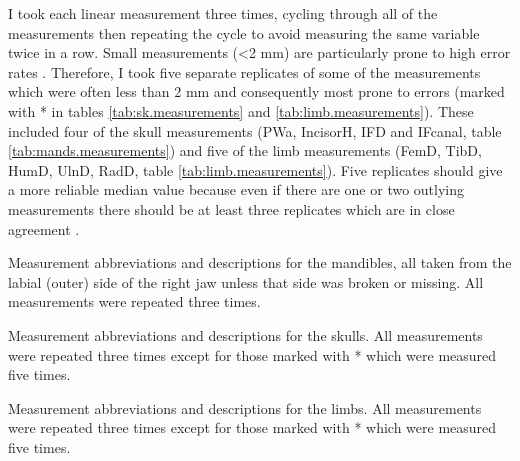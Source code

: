 	I took each linear measurement three times, cycling through all of the measurements then repeating the cycle to avoid measuring the same variable twice in a row. Small measurements (<2 mm) are particularly prone to high error rates \citep{Cardini2008}. Therefore, I took five separate replicates of some of the measurements which were often less than 2 mm and consequently most prone to errors (marked with * in tables \ref{tab:sk.measurements} and \ref{tab:limb.measurements}). These included four of the skull measurements (PWa, IncisorH, IFD and IFcanal, table \ref{tab:mands.measurements}) and five of the limb measurements (FemD, TibD, HumD, UlnD, RadD, table \ref{tab:limb.measurements}). 
	Five replicates should give a more reliable median value because even if there are one or two outlying measurements there should be at least three replicates which are in close agreement \citep{Cooper2009}.

\begin{table}[!htbp]
	\caption[Mandible measurements]
			{Measurement abbreviations and descriptions for the mandibles, all taken from the labial (outer) side of the right jaw unless that side was broken or missing. All measurements were repeated three times.}
	
	\label{tab:mands.measurements}
\end{table}



\begin{table}[!htbp]
	\caption[Skull measurements]
			{Measurement abbreviations and descriptions for the skulls. All measurements were repeated three times except for those marked with * which were measured five times.}%
	
	\label{tab:sk.measurements}
\end{table}


\begin{table}[!htbp]
	\caption[Limb measurements]
		{Measurement abbreviations and descriptions for the limbs. All measurements were repeated three times except for those marked with * which were measured five times.} %
	
	\label{tab:limb.measurements}
\end{table}


